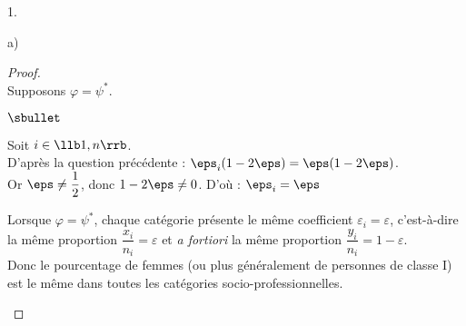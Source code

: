 \documentclass[11pt]{article}%
\begin{document}
\begin{noliste}{1.}
\begin{noliste}{a)}
  \begin{proof}~\\
  Supposons $\varphi=\psi^*$.
    \begin{noliste}{$\sbullet$}
      \item Soit $i \in \llb 1,n \rrb$.\\
      D'après la question précédente : $\eps_i(1-2\eps) = 
      \eps(1-2\eps)$.\\
      Or $\eps \neq \dfrac{1}{2}$, donc $1-2\eps \neq 0$. D'où :
      $
        \eps_i = \eps
      $
      
      \item Lorsque $\varphi = \psi^*$, chaque catégorie présente 
      le même coefficient $\varepsilon_i = \varepsilon$, c'est-à-dire 
      la même proportion $\dfrac{x_i}{n_i} = \varepsilon$ et \emph{a 
      fortiori} la même proportion $\dfrac{y_i}{n_i} = 
      1-\varepsilon$.\\[.1cm]      
      Donc le pourcentage de femmes (ou plus généralement de personnes
      de classe I) est le même dans toutes les catégories 
      socio-professionnelles. 
      ~\\[-1cm]
    \end{noliste}
  \end{proof}

 \end{noliste}
\end{noliste}
\end{document}
